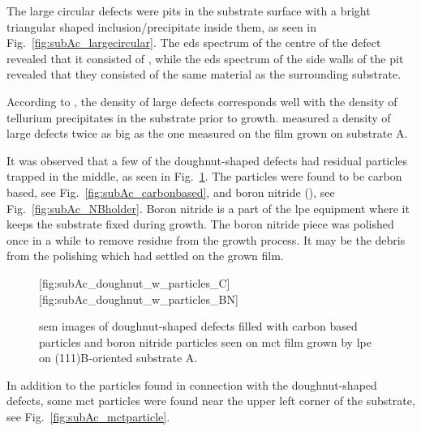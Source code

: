 The large circular defects were pits in the substrate surface with a bright triangular shaped inclusion/precipitate inside them, as seen in Fig.~\ref{fig:subAc_largecircular}. The \ac{eds} spectrum of the centre of the defect revealed that it consisted of , while the \ac{eds} spectrum of the side walls of the pit revealed that they consisted of the same material as the surrounding substrate. %

According to \citet{pelliciari1994te}, the density of large defects corresponds well with the density of tellurium precipitates in the substrate prior to growth. \citet{pelliciari1994te} measured a density of large defects twice as big as the one measured on the film grown on substrate A. %

It was observed that a few of the doughnut-shaped defects had residual particles trapped in the middle, as seen in Fig.~\ref{fig:subAc_doughnut_w_particles}. The particles were found to be carbon based, see Fig.~\ref{fig:subAc_carbonbased}, and boron nitride (), see Fig.~\ref{fig:subAc_NBholder}. Boron nitride is a part of the \ac{lpe} equipment where it keeps the substrate fixed during growth. The boron nitride piece was polished once in a while to remove residue from the growth process. It may be the debris from the polishing which had settled on the grown film.

\begin{figure}[htbp]
    \centering
    [fig:subAc_doughnut_w_particles_C]
    \hfill
    [fig:subAc_doughnut_w_particles_BN]
    \caption[\Ac{sem} images of doughnut-shaped defects filled with carbon based particles and boron nitride particles.]{\Ac{sem} images of doughnut-shaped defects filled with  carbon based particles and  boron nitride particles seen on \ac{mct} film grown by \ac{lpe} on (111)B-oriented substrate A.}
    \label{fig:subAc_doughnut_w_particles}
\end{figure}

In addition to the particles found in connection with the doughnut-shaped defects, some \ac{mct} particles were found near the upper left corner of the substrate, see Fig.~\ref{fig:subAc_mctparticle}.

